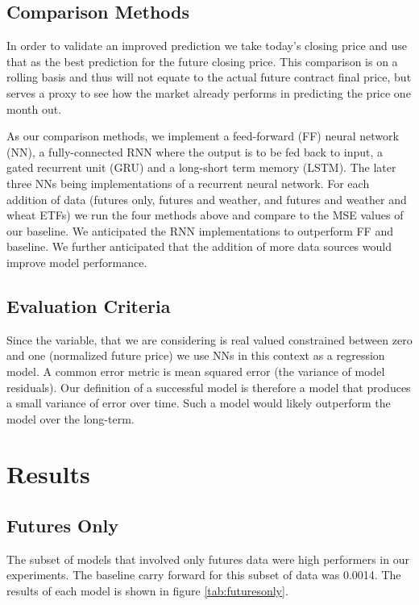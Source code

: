 \documentclass[twoside,11pt]{article}
\begin{document}
\subsection{Comparison Methods}

In order to validate an improved prediction we take today's closing price and use that as the best prediction for the future closing price. This comparison is on a rolling basis and thus will not equate to the actual future contract final price, but serves a proxy to see how the market already performs  in predicting the price one month out. 

As our comparison methods, we implement a feed-forward (FF) neural network (NN), a fully-connected RNN where the output is to be fed back to input, a gated recurrent unit (GRU) and a long-short term memory (LSTM). The later three NNs being implementations of a recurrent neural network. For each addition of data (futures only, futures and weather, and futures and weather and wheat ETFs) we run the four methods above and compare to the MSE values of our baseline. We anticipated the RNN implementations to outperform FF and baseline. We further anticipated that the addition of more data sources would improve model performance. 

\subsection{Evaluation Criteria}

Since the variable, that we are considering is real valued constrained between zero and one (normalized future price) we use NNs in this context as a regression model. A common error metric is mean squared error (the variance of model residuals). Our definition of a successful model is therefore a model that produces a small variance of error over time. Such a model would likely outperform the model over the long-term. 

\section{Results} \label{results}

\subsection{Futures Only}

The subset of models that involved only futures data were high performers in our experiments. The baseline carry forward for this subset of data was 0.0014. The results of each model is shown in figure \ref{tab:futuresonly}.
\end{document}
